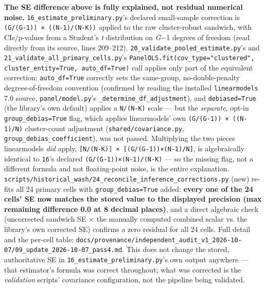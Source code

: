 \textbf{The SE difference above is fully explained, not residual numerical noise.} \texttt{16\_\allowbreak{}estimate\_\allowbreak{}preliminary.\allowbreak{}py}'s declared small-sample correction is \texttt{(G/\allowbreak{}(G-\allowbreak{}1)) × ((N-\allowbreak{}1)/\allowbreak{}(N-\allowbreak{}K))} applied to the raw cluster-robust sandwich, with CIs/p-values from a Student's \textit{t} distribution on \textit{G}−1 degrees of freedom (read directly from its source, lines 209--212). \texttt{20\_\allowbreak{}validate\_\allowbreak{}pooled\_\allowbreak{}estimate.\allowbreak{}py}'s and \texttt{21\_\allowbreak{}validate\_\allowbreak{}all\_\allowbreak{}primary\_\allowbreak{}cells.\allowbreak{}py}'s \texttt{PanelOLS.\allowbreak{}fit(cov\_\allowbreak{}type="clustered", cluster\_\allowbreak{}entity=True, auto\_\allowbreak{}df=True)} call applies only part of the equivalent correction: \texttt{auto\_\allowbreak{}df=True} correctly sets the same-group, no-double-penalty degrees-of-freedom convention (confirmed by reading the installed \texttt{linearmodels} 7.0 source, \texttt{panel/\allowbreak{}model.\allowbreak{}py}'s \texttt{\_\allowbreak{}determine\_\allowbreak{}df\_\allowbreak{}adjustment}), and \texttt{debiased=True} (the library's own default) applies a \texttt{N/\allowbreak{}(N-\allowbreak{}K)} scale --- but the \textit{separate}, opt-in \texttt{group\_\allowbreak{}debias=True} flag, which applies linearmodels' own \texttt{(G/\allowbreak{}(G-\allowbreak{}1)) × ((N-\allowbreak{}1)/\allowbreak{}N)} cluster-count adjustment (\texttt{shared/\allowbreak{}covariance.\allowbreak{}py}, \texttt{group\_\allowbreak{}debias\_\allowbreak{}coefficient}), was not passed. Multiplying the two pieces linearmodels \textit{did} apply, \texttt{[N/\allowbreak{}(N-\allowbreak{}K)] × [(G/\allowbreak{}(G-\allowbreak{}1))×(N-\allowbreak{}1)/\allowbreak{}N]}, is algebraically identical to \texttt{16}'s declared \texttt{(G/\allowbreak{}(G-\allowbreak{}1))×(N-\allowbreak{}1)/\allowbreak{}(N-\allowbreak{}K)} --- so the missing flag, not a different formula and not floating-point noise, is the entire explanation. \texttt{scripts/\allowbreak{}historical\_\allowbreak{}wash/\allowbreak{}24\_\allowbreak{}reconcile\_\allowbreak{}inference\_\allowbreak{}corrections.\allowbreak{}py} (new) re-fits all 24 primary cells with \texttt{group\_\allowbreak{}debias=True} added: \textbf{every one of the 24 cells' SE now matches the stored value to the displayed precision (max remaining difference 0.0 at 8 decimal places)}, and a direct algebraic check (uncorrected sandwich SE × the manually computed combined scalar vs. the library's own corrected SE) confirms a zero residual for all 24 cells. Full detail and the per-cell table: \texttt{docs/\allowbreak{}provenance/\allowbreak{}independent\_\allowbreak{}audit\_\allowbreak{}v1\_\allowbreak{}2026-\allowbreak{}10-\allowbreak{}07/\allowbreak{}09\_\allowbreak{}update\_\allowbreak{}2026-\allowbreak{}10-\allowbreak{}07\_\allowbreak{}pass4.\allowbreak{}md}. This does not change the stored, authoritative SE in \texttt{16\_\allowbreak{}estimate\_\allowbreak{}preliminary.\allowbreak{}py}'s own output anywhere --- that estimator's formula was correct throughout; what was corrected is the \textit{validation} scripts' covariance configuration, not the pipeline being validated.

